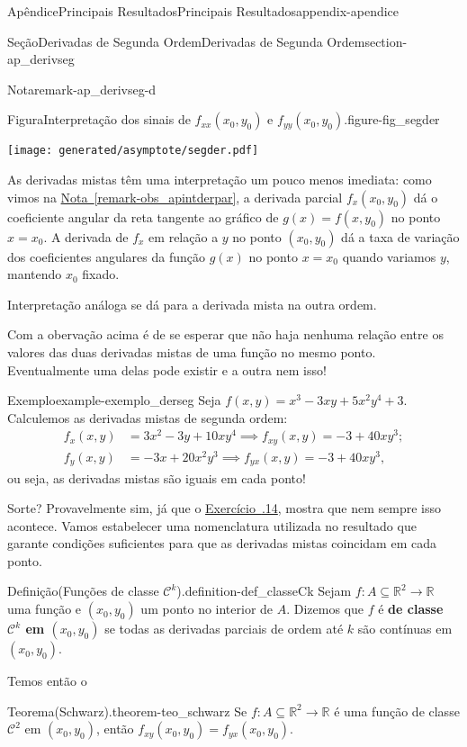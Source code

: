 \documentclass[oneside,10pt,]{book}
\newcommand{\xreffont}{\relax}
\newcommand{\terminology}[1]{\textbf{#1}}
\numberwithin{equation}{section}
\newcommand{\R}{\mathbb R}
\begin{document}
\begin{appendixptx}{Apêndice}{Principais Resultados}{}{Principais Resultados}{}{}{appendix-apendice}
\begin{sectionptx}{Seção}{Derivadas de Segunda Ordem}{}{Derivadas de Segunda Ordem}{}{}{section-ap_derivseg}
\begin{remark}{Nota}{}{remark-ap_derivseg-d}
\begin{figureptx}{Figura}{Interpretação dos sinais de \(f_{xx}(x_0,y_0)\) e \(f_{yy}(x_0,y_0)\).}{figure-fig_segder}{}
\begin{image}{0.25}{0.5}{0.25}{}%
\texttt{[image: generated/asymptote/segder.pdf]}
\end{image}%
\tcblower
\end{figureptx}%
%
\par
As derivadas mistas têm uma interpretação um pouco menos imediata: como vimos na \hyperref[remark-obs_apintderpar]{Nota~{\xreffont\ref{remark-obs_apintderpar}}}, a derivada parcial \(f_x(x_0,y_0)\) dá o coeficiente angular da reta tangente ao gráfico de \(g(x)=f(x,y_0)\) no ponto \(x=x_0\). A derivada de \(f_x\) em relação a \(y\) no ponto \((x_0,y_0)\) dá a taxa de variação dos coeficientes angulares da função \(g(x)\) no ponto \(x=x_0\) quando variamos \(y\), mantendo \(x_0\) fixado.%
\par
Interpretação análoga se dá para a derivada mista na outra ordem.%
\end{remark}
Com a obervação acima é de se esperar que não haja nenhuma relação entre os valores das duas derivadas mistas de uma função no mesmo ponto. Eventualmente uma delas pode existir e a outra nem isso!%
\begin{example}{Exemplo}{}{example-exemplo_derseg}%
Seja \(f(x,y)=x^3-3xy+5x^2y^4+3\). Calculemos as derivadas mistas de segunda ordem:%
\begin{align*}
f_x(x,y)&=3x^2-3y+10xy^4\implies
f_{xy}(x,y)=-3+40xy^3;\\
f_y(x,y)&=-3x+20x^2y^3\implies
f_{yx}(x,y)=-3+40xy^3,
\end{align*}
ou seja, as derivadas mistas são iguais em cada ponto!%
\end{example}
Sorte? Provavelmente sim, já que o \hyperlink{exercise-dif14}{Exercício~{\xreffont 1.5.14}}, mostra que nem sempre isso acontece. Vamos estabelecer uma nomenclatura utilizada no resultado que garante condições suficientes para que as derivadas mistas coincidam em cada ponto.%
\begin{definition}{Definição}{(Funções de classe \(\mathscr{C}^k\)).}{definition-def_classeCk}%
Sejam \(f\colon A\subseteq\R^2\to\R\) uma função e \((x_0,y_0)\) um ponto no interior de \(A\). Dizemos que \(f\) é \terminology{de classe \(\mathscr{C}^k\) em \((x_0,y_0)\)} se todas as derivadas parciais de ordem até \(k\) são contínuas em \((x_0,y_0)\).%
\end{definition}
Temos então o%
\begin{theorem}{Teorema}{(Schwarz).}{}{theorem-teo_schwarz}%
Se \(f\colon A\subseteq\R^2\to\R\) é uma função de classe \(\mathscr{C}^2\) em \((x_0,y_0)\), então \(f_{xy}(x_0,y_0)=f_{yx}(x_0,y_0)\).%

\end{theorem}
\end{sectionptx}
\end{appendixptx}
\end{document}
